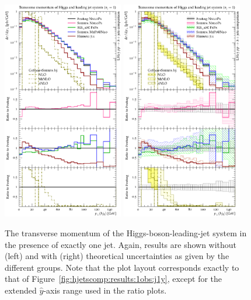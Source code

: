 \begin{figure}[t!]
  \centering
  \includegraphics[width=0.47\textwidth]{figures/hjetscomp_u_Hj_pT_excl.pdf}
  \hfill
  \includegraphics[width=0.47\textwidth]{figures/hjetscomp_Hj_pT_excl.pdf}
  \caption{\label{fig:hjetscomp:results:1obs:hj_pt_excl}%
    The transverse momentum of the Higgs-boson-leading-jet system in
    the presence of exactly one jet. Again, results are shown without
    (left) and with (right) theoretical uncertainties as given by the
    different groups. Note that the plot layout corresponds exactly to
    that of Figure~\ref{fig:hjetscomp:results:1obs:j1y}, except for
    the extended $\hat y$-axis range used in the ratio plots.}
\end{figure}

